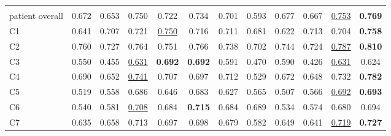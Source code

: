 \begin{minipage}{\textwidth}
{\begin{tabular}{@{}lccccccccccc@{}}
\addlinespace
\multicolumn{12}{@{}l}{\textit{joint}} \\
patient overall & 0.672 & 0.653 & 0.750 & 0.722 & 0.734 & 0.701 & 0.593 & 0.677 & 0.667 & \underline{0.753} & \textbf{0.769} \\
C1 & 0.641 & 0.707 & 0.721 & \underline{0.750} & 0.716 & 0.711 & 0.681 & 0.622 & 0.713 & 0.704 & \textbf{0.758} \\
C2 & 0.760 & 0.727 & 0.764 & 0.751 & 0.766 & 0.738 & 0.702 & 0.744 & 0.724 & \underline{0.787} & \textbf{0.810} \\
C3 & 0.550 & 0.455 & \underline{0.631} & \textbf{0.692} & \textbf{0.692} & 0.591 & 0.470 & 0.590 & 0.426 & \underline{0.631} & 0.624 \\
C4 & 0.690 & 0.652 & \underline{0.741} & 0.707 & 0.697 & 0.712 & 0.529 & 0.672 & 0.648 & 0.732 & \textbf{0.782} \\
C5 & 0.519 & 0.558 & 0.686 & 0.646 & 0.683 & 0.627 & 0.565 & 0.507 & 0.566 & \underline{0.692} & \textbf{0.693} \\
C6 & 0.540 & 0.581 & \underline{0.708} & 0.684 & \textbf{0.715} & 0.684 & 0.689 & 0.534 & 0.574 & 0.680 & 0.694 \\
C7 & 0.635 & 0.658 & 0.713 & 0.697 & 0.698 & 0.679 & 0.582 & 0.649 & 0.641 & \underline{0.719} & \textbf{0.727} \\
\bottomrule
\end{tabular}
}\end{minipage}
\par\bigskip
